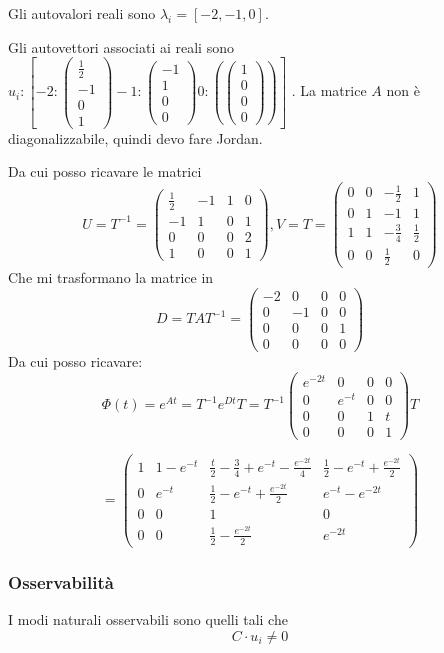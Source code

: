 \documentclass{article}
\begin{document}
Gli autovalori reali sono $\lambda_i = [-2, -1, 0]$.

Gli autovettori associati ai reali sono $ u_i: [  -2: \left(\begin{matrix}\frac{1}{2}\\-1\\0\\1\end{matrix}\right)-1: \left(\begin{matrix}-1\\1\\0\\0\end{matrix}\right)0: (\left(\begin{matrix}1\\0\\0\\0\end{matrix}\right)) ]$
.
La matrice $A$ non è diagonalizzabile, quindi devo fare Jordan.

Da cui posso ricavare le matrici \[U=T^{-1} = \left(\begin{matrix}\frac{1}{2} & -1 & 1 & 0\\-1 & 1 & 0 & 1\\0 & 0 & 0 & 2\\1 & 0 & 0 & 1\end{matrix}\right), V = T = \left(\begin{matrix}0 & 0 & - \frac{1}{2} & 1\\0 & 1 & -1 & 1\\1 & 1 & - \frac{3}{4} & \frac{1}{2}\\0 & 0 & \frac{1}{2} & 0\end{matrix}\right)\]
Che mi trasformano la matrice in \[ D = TAT^{-1} = \left(\begin{matrix}-2 & 0 & 0 & 0\\0 & -1 & 0 & 0\\0 & 0 & 0 & 1\\0 & 0 & 0 & 0\end{matrix}\right) \]
Da cui posso ricavare: \[ \Phi(t) = e^{At} = T^{-1} e^{Dt} T =  T^{-1} \left(\begin{matrix}e^{- 2 t} & 0 & 0 & 0\\0 & e^{- t} & 0 & 0\\0 & 0 & 1 & t\\0 & 0 & 0 & 1\end{matrix}\right) T\]

\[ = \left(\begin{matrix}1 & 1 - e^{- t} & \frac{t}{2} - \frac{3}{4} + e^{- t} - \frac{e^{- 2 t}}{4} & \frac{1}{2} - e^{- t} + \frac{e^{- 2 t}}{2}\\0 & e^{- t} & \frac{1}{2} - e^{- t} + \frac{e^{- 2 t}}{2} & e^{- t} - e^{- 2 t}\\0 & 0 & 1 & 0\\0 & 0 & \frac{1}{2} - \frac{e^{- 2 t}}{2} & e^{- 2 t}\end{matrix}\right) \]\subsubsection{Osservabilità}
 I modi naturali osservabili sono quelli tali che 
\[ C \cdot u_i   \neq 0\]
\end{document}
